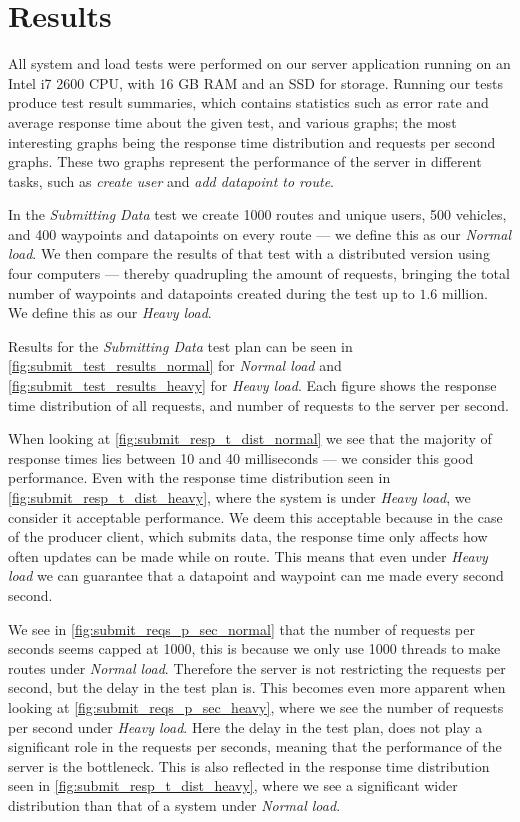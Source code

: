 \section{Results}
All system and load tests were performed on our server application running on an Intel i7 2600 CPU, with 16 GB RAM and an SSD for storage.
Running our tests produce test result summaries, which contains statistics such as error rate and average response time about the given test, and various graphs;
the most interesting graphs being the response time distribution and requests per second graphs.
These two graphs represent the performance of the server in different tasks, such as \textit{create user} and \textit{add datapoint to route}.

In the \textit{Submitting Data} test we create 1000 routes and unique users, 500 vehicles, and 400 waypoints and datapoints on every route --- we define this as our \textit{Normal load}.
We then compare the results of that test with a distributed version using four computers --- thereby quadrupling the amount of requests, bringing the total number of waypoints and datapoints created during the test up to $1.6$ million.
We define this as our \textit{Heavy load}.

\bigskip
Results for the \textit{Submitting Data} test plan can be seen in \cref{fig:submit_test_results_normal} for \textit{Normal load} and \cref{fig:submit_test_results_heavy} for \textit{Heavy load}.
Each figure shows the response time distribution of all requests, and number of requests to the server per second.

When looking at \cref{fig:submit_resp_t_dist_normal} we see that the majority of response times lies between 10 and 40 milliseconds --- we consider this good performance.
Even with the response time distribution seen in \cref{fig:submit_resp_t_dist_heavy}, where the system is under \textit{Heavy load}, we consider it acceptable performance.
We deem this acceptable because in the case of the producer client, which submits data, the response time only affects how often updates can be made while on route.
This means that even under \textit{Heavy load} we can guarantee that a datapoint and waypoint can me made every second second.

We see in \cref{fig:submit_reqs_p_sec_normal} that the number of requests per seconds seems capped at 1000, this is because we only use 1000 threads to make routes under \textit{Normal load}.
Therefore the server is not restricting the requests per second, but the delay in the test plan is.
This becomes even more apparent when looking at \cref{fig:submit_reqs_p_sec_heavy}, where we see the number of requests per second under \textit{Heavy load}.
Here the delay in the test plan, does not play a significant role in the requests per seconds, meaning that the performance of the server is the bottleneck.
This is also reflected in the response time distribution seen in \cref{fig:submit_resp_t_dist_heavy}, where we see a significant wider distribution than that of a system under \textit{Normal load}.

